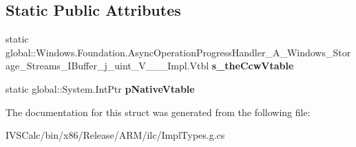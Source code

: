 \subsection*{Static Public Attributes}
\begin{DoxyCompactItemize}
\item 
\mbox{\label{struct_windows_1_1_foundation_1_1_async_operation_progress_handler___a___windows___storage___stra482c68c8c7180278b02d484f8142a67_a708f801d02aa105b7d84600e9465db7a}} 
static global\+::\+Windows.\+Foundation.\+Async\+Operation\+Progress\+Handler\+\_\+\+A\+\_\+\+Windows\+\_\+\+Storage\+\_\+\+Streams\+\_\+\+I\+Buffer\+\_\+j\+\_\+uint\+\_\+\+V\+\_\+\+\_\+\+\_\+\+Impl.\+Vtbl {\bfseries s\+\_\+the\+Ccw\+Vtable}
\item 
\mbox{\label{struct_windows_1_1_foundation_1_1_async_operation_progress_handler___a___windows___storage___stra482c68c8c7180278b02d484f8142a67_ab0d3404de4bcaf1ec8881697b147cb78}} 
static global\+::\+System.\+Int\+Ptr {\bfseries p\+Native\+Vtable}
\end{DoxyCompactItemize}


The documentation for this struct was generated from the following file\+:\begin{DoxyCompactItemize}
\item 
I\+V\+S\+Calc/bin/x86/\+Release/\+A\+R\+M/ilc/Impl\+Types.\+g.\+cs\end{DoxyCompactItemize}
